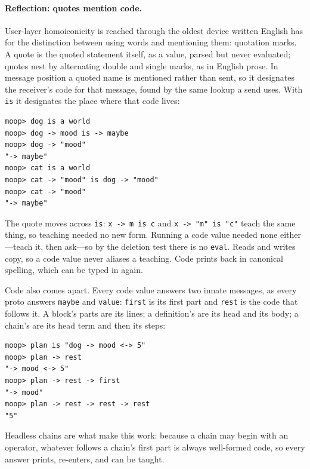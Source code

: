 \documentclass[11pt]{article}
\theoremstyle{definition}
\theoremstyle{remark}
\newcommand{\code}[1]{\texttt{#1}}
\begin{document}
\paragraph{Reflection: quotes mention code.}
User-layer homoiconicity is reached through the oldest device written
English has for the distinction between using words and mentioning them:
quotation marks. A quote is the quoted statement itself, as a value,
parsed but never evaluated; quotes nest by alternating double and single
marks, as in English prose. In message position a quoted name is
mentioned rather than sent, so it designates the receiver's code for
that message, found by the same lookup a send uses. With \code{is} it
designates the place where that code lives:
\begin{Verbatim}[fontsize=\small,xleftmargin=2em]
moop> dog is a world
moop> dog -> mood is -> maybe
moop> dog -> "mood"
"-> maybe"
moop> cat is a world
moop> cat -> "mood" is dog -> "mood"
moop> cat -> "mood"
"-> maybe"
\end{Verbatim}
The quote moves across \code{is}: \code{x -> m is c} and
\code{x -> "m" is "c"} teach the same thing, so teaching needed no new
form. Running a code value needed none either---teach it, then ask---so
by the deletion test there is no \code{eval}. Reads and writes copy, so
a code value never aliases a teaching. Code prints back in canonical
spelling, which can be typed in again.

Code also comes apart. Every code value answers two innate messages, as
every proto answers \code{maybe} and \code{value}: \code{first} is its
first part and \code{rest} is the code that follows it. A block's parts
are its lines; a definition's are its head and its body; a chain's are
its head term and then its steps:
\begin{Verbatim}[fontsize=\small,xleftmargin=2em]
moop> plan is "dog -> mood <-> 5"
moop> plan -> rest
"-> mood <-> 5"
moop> plan -> rest -> first
"-> mood"
moop> plan -> rest -> rest -> rest
"5"
\end{Verbatim}
Headless chains are what make this work: because a chain may begin with
an operator, whatever follows a chain's first part is always well-formed
code, so every answer prints, re-enters, and can be taught.
\end{document}
